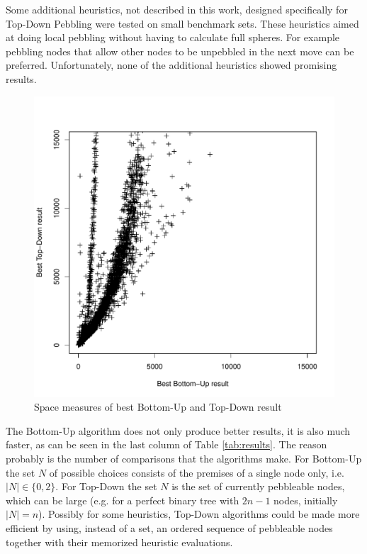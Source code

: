 Some additional heuristics, not described in this work, designed specifically for Top-Down Pebbling were tested on small benchmark sets.
These heuristics aimed at doing local pebbling without having to calculate full spheres.
For example pebbling nodes that allow other nodes to be unpebbled in the next move can be preferred.
Unfortunately, none of the additional heuristics showed promising results.


\begin{figure}
	\centering
	\includegraphics[scale=0.5]{chapters/pebbling/figures/td_vs_bu.pdf}
	\caption{Space measures of best Bottom-Up and Top-Down result}
	\label{fig:BUvsTD}
\end{figure}

The Bottom-Up algorithm does not only produce better results, it is also much faster, as can be seen in the last column of Table \ref{tab:results}. 
The reason probably is the number of comparisons that the algorithms make. 
For Bottom-Up the set $N$ of possible choices consists of the premises of a single node only, i.e. $|N| \in \{0,2\}$.
For Top-Down the set $N$ is the set of currently pebbleable nodes, which can be large (e.g. for a perfect binary tree with $2n -1$ nodes, initially $|N| = n$). 
Possibly for some heuristics, Top-Down algorithms could be made more efficient by using, instead of a set, an ordered sequence of pebbleable nodes together with their memorized heuristic evaluations.

